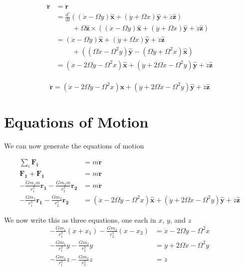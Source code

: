 \documentclass{article}
\newcommand{\dd}[2]{\frac{\mathrm{d}#1}{\mathrm{d}#2}}
\newcommand{\vv}[1]{\boldsymbol{#1}}
\newcommand{\vh}[1]{\boldsymbol{\hat{#1}}}
\begin{document}
\[
\begin{aligned}
    \vv{\ddot{r}}&=\dot{\vv{r}}\\
    &=\dd{^c}{t}\left(\left(\dot{x}-\Omega y\right)\vh{x}+\left(\dot{y}+\Omega x\right)\vh{y}+\dot{z}\vh{z}\right)\\
        &\phantom{=}\quad+\Omega \vh{z}\times\left(\left(\dot{x}-\Omega y\right)\vh{x}+\left(\dot{y}+\Omega x\right)\vh{y}+\dot{z}\vh{z}\right)\\
    &=\left(\ddot{x}-\Omega \dot{y}\right)\vh{x}+\left(\ddot{y}+\Omega \dot{x}\right)\vh{y}+\ddot{z}\vh{z}\\
        &\phantom{=}\quad+\left(\left(\Omega\dot{x}-\Omega^2 y\right)\vh{y}-\left(\Omega\dot{y}+\Omega^2 x\right)\vh{x}\right)\\
    &=\left(\ddot{x}-2\Omega\dot{y}-\Omega^2 x\right)\vh{x} + \left(\ddot{y}+2\Omega\dot{x}-\Omega^2 y\right)\vh{y}+\ddot{z}\vh{z}\\
\end{aligned}
\]

\[\boxed{\vv{\ddot{r}}=\left(\ddot{x}-2\Omega\dot{y}-\Omega^2 x\right)\vh{x} + \left(\ddot{y}+2\Omega\dot{x}-\Omega^2 y\right)\vh{y}+\ddot{z}\vh{z}}\]

\section*{Equations of Motion}
We can now generate the equations of motion

\[\begin{aligned}
\sum_i \vv{F_i}&=m\vv{\ddot{r}}\\
\vv{F_1}+\vv{F_1}&=m\vv{\ddot{r}}\\
-\frac{Gm_1m}{r_1^3}\vv{r_1}-\frac{Gm_2m}{r_2^3}\vv{r_2}&=m\vv{\ddot{r}}\\
-\frac{Gm_1}{r_1^3}\vv{r_1}-\frac{Gm_2}{r_2^3}\vv{r_2}&=\left(\ddot{x}-2\Omega\dot{y}-\Omega^2 x\right)\vh{x} + \left(\ddot{y}+2\Omega\dot{x}-\Omega^2 y\right)\vh{y}+\ddot{z}\vh{z}
\end{aligned}\]

We now write this as three equations, one each in $x$, $y$, and $z$
\[\begin{aligned}
    -\frac{Gm_1}{r_1^3}(x+x_1)-\frac{Gm_2}{r_2^3}(x-x_2)&=\ddot{x}-2\Omega\dot{y}-\Omega^2 x\\
    -\frac{Gm_1}{r_1^3}y-\frac{Gm_2}{r_2^3}y&=\ddot{y}+2\Omega\dot{x}-\Omega^2 y\\
    -\frac{Gm_1}{r_1^3}z-\frac{Gm_2}{r_2^3}z&=\ddot{z}
\end{aligned}\]
\end{document}
